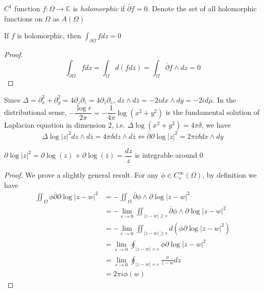 \documentclass[../main.tex]{subfiles}
\begin{document}
\begin{definition}
$C^1$ function $f:\Omega\to\mathbb C$ is \textit{holomorphic} if $\bar\partial f=0$. Denote the set of all holomorphic functions on $\Omega$ as $A(\Omega)$
\end{definition}

\begin{lemma}
If $f$ is holomorphic, then $\displaystyle\int_{\partial \Omega}fdz=0$
\end{lemma}

\begin{proof}
\[\int_{\partial \Omega}fdz=\int_\Omega d(fdz)=\int_\Omega\bar\partial f\wedge dz=0\]
\end{proof}

\begin{theorem}\label{Poincare-Lelong formula}
Since $\Delta=\partial_x^2+\partial_y^2=4\partial_z\partial_{\bar z}=4\partial_{\bar z}\partial_z$, $dz\wedge d\bar z=-2idx\wedge dy=-2id\mu$. In the distributional sense, $-\dfrac{\log r}{2\pi}=-\dfrac{1}{4\pi}\log(x^2+y^2)$ is the fundamental solution of Laplacian equation in dimension $2$, i.e. $\Delta\log(x^2+y^2)=4\pi\delta$, we have
\[\Delta\log|z|^2dz\wedge d\bar z=4\pi\delta dz\wedge d\bar z\Leftrightarrow\bar\partial\partial\log|z|^2=2\pi i\delta dx\wedge dy\]
\end{theorem}

\begin{note}
$\partial\log|z|^2=\partial\log(z)+\partial\log(\bar z)=\dfrac{dz}{z}$ is integrable around $0$
\end{note}

\begin{proof}
We prove a slightly general result. For any $\phi\in C^\infty_c(\Omega)$, by definition we have
\begin{align*}
\iint_{\Omega}\phi\bar\partial\partial\log|z-w|^2&=-\iint_{\Omega}\bar\partial\phi\wedge\partial\log|z-w|^2 \\
&=-\lim_{\epsilon\to0}\iint_{|z-w|\geq\epsilon}\bar\partial\phi\wedge\partial\log|z-w|^2 \\
&=-\lim_{\epsilon\to0}\iint_{|z-w|\geq\epsilon} d\left(\phi\partial\log|z-w|^2\right) \\
&=\lim_{\epsilon\to0}\oint_{|z-w|=\epsilon} \phi\partial\log|z-w|^2 \\
&=\lim_{\epsilon\to0}\oint_{|z-w|=\epsilon} \frac{\phi}{z-w}dz \\
&=2\pi i\phi(w)
\end{align*}
\end{proof}
\end{document}
